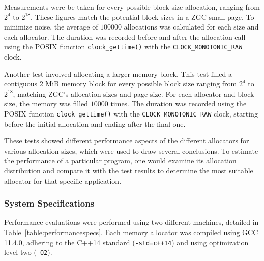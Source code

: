 Measurements were be taken for every possible block size allocation, ranging from $2^4$ to $2^{18}$. These figures match the potential block sizes in a ZGC small page. To minimize noise, the average of $100 000$ allocations was calculated for each size and each allocator. The duration was recorded before and after the allocation call using the POSIX function \texttt{clock\_gettime()} with the \texttt{CLOCK\_MONOTONIC\_RAW} clock.

Another test involved allocating a larger memory block. This test filled a contiguous 2 MiB memory block for every possible block size ranging from $2^4$ to $2^{18}$, matching ZGC's allocation sizes and page size. For each allocator and block size, the memory was filled $10 000$ times. The duration was recorded using the POSIX function \texttt{clock\_gettime()} with the \texttt{CLOCK\_MONOTONIC\_RAW} clock, starting before the initial allocation and ending after the final one.

These tests showed different performance aspects of the different allocators for various allocation sizes, which were used to draw several conclusions. To estimate the performance of a particular program, one would examine its allocation distribution and compare it with the test results to determine the most suitable allocator for that specific application.

\subsubsection{System Specifications}
Performance evaluations were performed using two different machines, detailed in Table~\ref{table:performancespecs}. Each memory allocator was compiled using GCC 11.4.0, adhering to the C++14 standard (\texttt{-std=c++14}) and using optimization level two (\texttt{-O2}).

